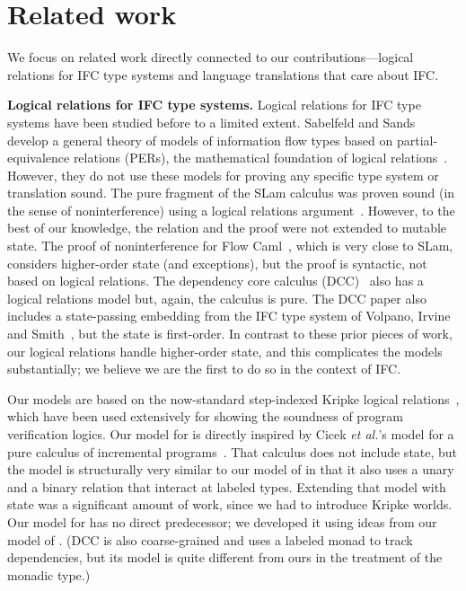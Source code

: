 \section{Related work}
\label{sec:related}

We focus on related work directly connected to our
contributions---logical relations for IFC type systems and language
translations that care about IFC.

\medskip \noindent \textbf{Logical relations for IFC type systems.}
Logical relations for IFC type systems have been studied before to a
limited extent. Sabelfeld and Sands develop a general theory of models
of information flow types based on partial-equivalence relations
(PERs), the mathematical foundation of logical
relations~\cite{esop99-PER-IFC}. However, they do not use these models
for proving any specific type system or translation sound. The pure
fragment of the SLam calculus was proven sound (in the sense of
noninterference) using a logical relations argument~\cite[Appendix
  A]{popl98-SLAM}. However, to the best of our knowledge, the relation
and the proof were not extended to mutable state. The proof of
noninterference for Flow Caml~\cite{toplas03-flowcaml}, which is very
close to SLam, considers higher-order state (and exceptions), but the
proof is syntactic, not based on logical relations. The dependency
core calculus (DCC)~\cite{popl99-DCC} also has a logical relations
model but, again, the calculus is pure. The DCC paper also includes a
state-passing embedding from the IFC type system of Volpano, Irvine
and Smith~\cite{jcs96-volpanoSmith}, but the state is
first-order.  In contrast to these
prior pieces of work, our logical relations handle higher-order state,
and this complicates the models substantially; we believe we are the
first to do so in the context of IFC.

Our models are based on the now-standard step-indexed Kripke logical
relations~\cite{DBLP:conf/popl/AhmedDR09}, which have been used
extensively for showing the soundness of program verification
logics. Our model for {\fg} is directly inspired by Cicek \emph{et
  al.}'s model for a pure calculus of incremental
programs~\cite{DBLP:conf/icfp/CicekP016}. That calculus does not
include state, but the model is structurally very similar to our model
of {\fg} in that it also uses a unary and a binary relation that
interact at labeled types. Extending that model with state was a
significant amount of work, since we had to introduce Kripke
worlds. Our model for {\cg} has no direct predecessor; we developed it
using ideas from our model of {\fg}. (DCC is also coarse-grained and
uses a labeled monad to track dependencies, but its model is quite
different from ours in the treatment of the monadic type.)

